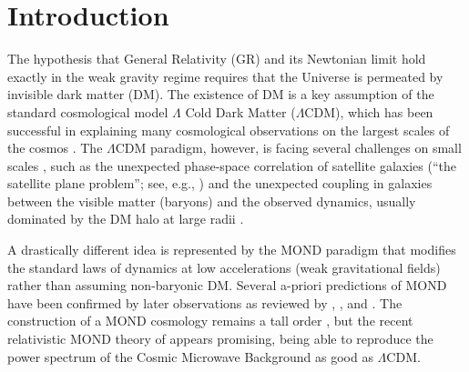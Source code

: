 \documentclass[twocolumn,tighten]{aastex63}
\begin{document}


\section{Introduction} \label{sec:intro}

The hypothesis that General Relativity (GR) and its Newtonian limit hold exactly in the weak gravity regime requires that the Universe is permeated by invisible dark matter (DM). The existence of DM is a key assumption of the standard cosmological model $\Lambda$ Cold Dark Matter ($\Lambda$CDM), which has been successful in explaining many cosmological observations on the largest scales of the cosmos \citep{Peb12, FW12}. The $\Lambda$CDM paradigm, however, is facing several challenges on small scales \citep{BBK17, Krou15}, such as the unexpected phase-space correlation of satellite galaxies (``the satellite plane problem''; see, e.g., \citealt{Krou10,Mul18}) and the unexpected coupling in galaxies between the visible matter (baryons) and the observed dynamics, usually dominated by the DM halo at large radii \citep{MLS, Lel17}.

A drastically different idea is represented by the MOND paradigm \citep{Mil83} that modifies the standard laws of dynamics at low accelerations (weak gravitational fields) rather than assuming non-baryonic DM. Several a-priori predictions of MOND have been confirmed by later observations as reviewed by \cite{SM02}, \cite{FM12}, and \cite{McG20}. The construction of a MOND cosmology remains a tall order \citep{McG15}, but the recent relativistic MOND theory of \cite{Skor20} appears promising, being able to reproduce the power spectrum of the Cosmic Microwave Background as good as $\Lambda$CDM.
\end{document}
